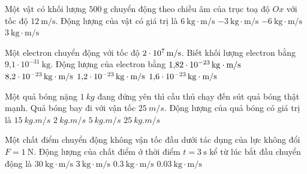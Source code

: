\begin{ex}
	Một vật có khối lượng $\SI{500}{\gram}$ chuyển động theo chiều âm của trục toạ độ $Ox$ với tốc độ $\SI{12}{\meter/\second}$. Động lượng của vật có giá trị là
	\choice
	{$\SI{6}{\kilogram\cdot\meter/\second}$}
	{$\SI{-3}{\kilogram\cdot\meter/\second}$}
	{\True $\SI{-6}{\kilogram\cdot\meter/\second}$}
	{$\SI{3}{\kilogram\cdot\meter/\second}$}
\end{ex}
\begin{ex}
Một electron chuyển động với tốc độ $\xsi{2\cdot 10^7}{m/s}$. Biết khối lượng electron bằng $\text{9,1} \cdot 10^{-31}\ \text{kg}.$ Động lượng của electron bằng	
	\choice
	{\True $\SI{1.82E-23}{\kilogram\cdot\meter/\second}$}
	{$\SI{8.2E-23}{\kilogram\cdot\meter/\second}$}
	{$\SI{1.2E-23}{\kilogram\cdot\meter/\second}$}
	{$\SI{1.6E-23}{\kilogram\cdot\meter/\second}$}
\end{ex}
\begin{ex}
Một quả bóng nặng $\SI{1}{kg}$ đang đứng yên thì cầu thủ chạy đến sút quả bóng thật mạnh. Quả bóng bay đi với vận tốc $\SI{25}{m/s}$. Động lượng của quả bóng có giá trị là
			\choice
			{$\SI{15}{kg.m/s}$}
			{$\SI{2}{kg.m/s}$}
			{$\SI{5}{kg.m/s}$}
			{\True $\SI{25}{kg.m/s}$}
		\end{ex}
\begin{ex}
Một chất điểm chuyển động không vận tốc đầu dưới tác dụng của lực không đổi $F =\SI{1}{\newton}$. Động lượng của chất điểm ở thời điểm $t = \SI{3}{\second}$ kể từ lúc bắt đầu chuyển động là	
	\choice
	{$\SI{30}{\kilogram\cdot\meter/\second}$}
	{\True $\SI{3}{\kilogram\cdot\meter/\second}$}
	{$\SI{0.3}{\kilogram\cdot\meter/\second}$}
	{$\SI{0.03}{\kilogram\cdot\meter/\second}$}
\end{ex}
